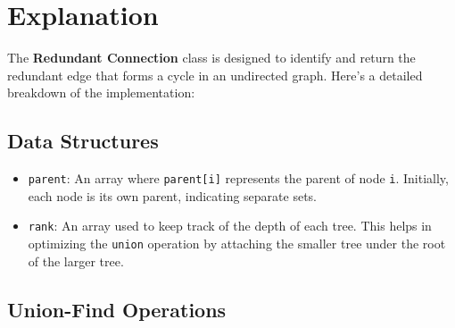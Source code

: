 \section*{Explanation}

The \textbf{Redundant Connection} class is designed to identify and return the redundant edge that forms a cycle in an undirected graph. Here's a detailed breakdown of the implementation:

\subsection*{Data Structures}

\begin{itemize}
    \item \texttt{parent}:  
    An array where \texttt{parent[i]} represents the parent of node \texttt{i}. Initially, each node is its own parent, indicating separate sets.
    
    \item \texttt{rank}:  
    An array used to keep track of the depth of each tree. This helps in optimizing the \texttt{union} operation by attaching the smaller tree under the root of the larger tree.
\end{itemize}

\subsection*{Union-Find Operations}

